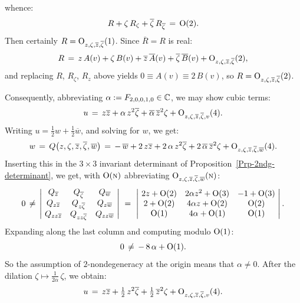 \documentclass[12pt,twoside,leqno,openany]{amsart}
\begin{document}
whence:
\[
R
+
\zeta\,R_{\zeta}
+
\overline{\zeta}\,R_{\overline{\zeta}}
\,=\,
{\rm O}(2).
\]
Then certainly $R = {\rm O}_{z, \zeta, 
\overline{z}, \overline{\zeta}} (1)$. Since $\overline{R} = R$ 
is real:
\[
R
\,=\,
z\,A(v)
+
\zeta\,B(v)
+
\overline{z}\,\overline{A}(v)
+
\overline{\zeta}\,\overline{B}(v)
+
{\rm O}_{z,\zeta,\overline{z},\overline{\zeta}}(2),
\]
and replacing $R$, $R_\zeta$, $R_z$ above
yields $0 \equiv A(v) \equiv 2\,B(v)$, so
$R = {\rm O}_{z, \zeta, \overline{z}, \overline{\zeta}}(2)$.
\endproof

\label{expression-2-ndg-origin}

Consequently, abbreviating $\alpha := F_{2,0,0,1,0} \in \mathbb{C}$, we may
show cubic terms:
\[
u
\,=\,
z\overline{z}
+
\alpha\,
z^2\overline{\zeta}
+
\overline{\alpha}\,
\overline{z}^2\zeta
+
{\rm O}_{z,\zeta,\overline{z},\overline{\zeta},v}(4).
\]
Writing $u = \frac{1}{2} w + \frac{1}{2} \overline{w}$,
and solving for $w$, we get:
\[
w
\,=\,
Q\big(z,\zeta,\overline{z},\overline{\zeta},\overline{w}\big)
\,=\,
-\,\overline{w}
+
2\,
z\overline{z}
+
2\,\alpha\,z^2\overline{\zeta}
+
2\,\overline{\alpha}\,
\overline{z}^2\zeta
+
{\rm O}_{z,\zeta,\overline{z},\overline{\zeta},\overline{w}}(4).
\]
Inserting this in the $3 \times 3$ invariant 
determinant of Proposition~{\ref{Prp-2ndg-determinant}}, we get, 
with ${\rm O}(\text{\sc n})$ abbreviating ${\rm O}_{z, \zeta, 
\overline{z}, \overline{\zeta}, \overline{w}} (\text{\sc n})$:
\[
0
\,\neq\,
\left\vert\!
\begin{array}{ccc}
Q_{\overline{z}} & Q_{\overline{\zeta}} 
& 
Q_{\overline{w}}
\\
Q_{z\overline{z}} & Q_{z\overline{\zeta}} 
& 
Q_{z\overline{w}}
\\
Q_{zz\overline{z}} & Q_{zz\overline{\zeta}} 
& 
Q_{zz\overline{w}}
\end{array}
\!\right\vert
\,\,=\,\,
\left\vert\!
\begin{array}{ccc}
2z+{\rm O}(2) & 2\alpha z^2+{\rm O}(3) & -1+{\rm O}(3)
\\
2+{\rm O}(2) & 4\alpha z+{\rm O}(2) & {\rm O}(2)
\\
{\rm O}(1) & 4\alpha+{\rm O}(1) & {\rm O}(1)
\end{array}
\!\right\vert. 
\]
Expanding along the last column and computing modulo ${\rm O}(1)$:
\[
0
\,\neq\,
-\,8\,\alpha
+
{\rm O}(1).
\]
So the assumption of $2$-nondegeneracy at the origin means that
$\alpha \neq 0$. After the dilation $\zeta \longmapsto 
\frac{1}{2\alpha}\, \zeta$, we obtain:
\[
u
\,=\,
z\overline{z}
+
\tfrac{1}{2}\,
z^2\overline{\zeta}
+
\tfrac{1}{2}\,
\overline{z}^2\zeta
+
{\rm O}_{z,\zeta,\overline{z},\overline{\zeta},v}(4).
\]
\end{document}
